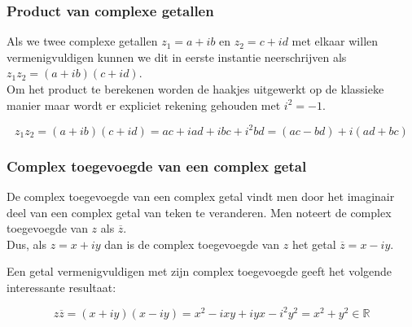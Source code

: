 \subsubsection{Product van complexe getallen}

Als we twee complexe getallen $z_{1}=a+ib$ en $z_{2}=c+id$ met elkaar willen vermenigvuldigen kunnen we dit in eerste instantie neerschrijven als $z_{1} z_{2}=(a+ib)(c+id)$.\\
Om het product te berekenen worden de haakjes uitgewerkt op de klassieke manier maar wordt er expliciet rekening gehouden met $i^2 =-1$.\\

\begin{eigenschap}
	\begin{framed}
\[ z_{1}z_{2}=(a+ib)(c+id)=ac+iad+ibc+i^2 bd=(ac-bd)+i(ad+bc) \]
\end{framed}
\end{eigenschap}

\subsubsection{Complex toegevoegde van een complex getal}

\begin{definitie}
	De complex toegevoegde van een complex getal vindt men door het imaginair deel van een complex getal van teken te veranderen. Men noteert de complex toegevoegde van $z$ als $\overline{z}$.\\
Dus, als $z=x+iy$ dan is de complex toegevoegde van $z$ het getal $\overline{z}=x-iy$.\\
\end{definitie}
\begin{eigenschap}
	Een getal vermenigvuldigen met zijn complex toegevoegde geeft het volgende interessante resultaat:

\begin{framed}
\[ z \overline{z}=(x+iy)(x-iy)=x^2 -ixy+iyx-i^2 y^2=x^2 +y^2 \in \mathbb{R} \]
\end{framed}
\end{eigenschap}


\begin{figure}[H]
	\centering 
	 
\end{figure}





